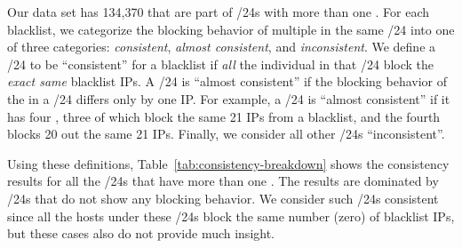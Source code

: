 

Our data set has 134,370 {} that are part of /24s with more
than one {}.  For each blacklist, we categorize the blocking
behavior of multiple {} in the same /24 into one of three
categories: \textit{consistent}, \textit{almost consistent}, and
\textit{inconsistent}.  We define a /24 to be ``consistent'' for a
blacklist if \textit{all} the individual {} in that /24
block the \textit{exact same} blacklist IPs.
%
A /24 is ``almost consistent'' if the blocking behavior of the
{} in a /24 differs only by one IP. For example, a /24 is
``almost consistent'' if it has four {}, three of which
block the same 21 IPs from a blacklist, and the fourth {}
blocks 20 out the same 21 IPs.
%
Finally, we consider all other /24s ``inconsistent''.




Using these definitions, Table~\ref{tab:consistency-breakdown} shows
the consistency results for all the /24s that have more than one
{}. The results are dominated by /24s that do not show any
blocking behavior.  We consider such /24s consistent since all the
hosts under these /24s block the same number (zero) of blacklist IPs,
but these cases also do not provide much insight.


